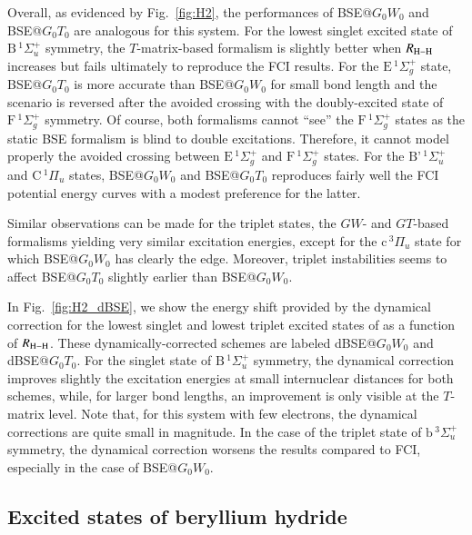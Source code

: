 \documentclass[aip,jcp,reprint,noshowkeys,superscriptaddress]{revtex4-1}
\begin{document}
Overall, as evidenced by Fig.~\ref{fig:H2}, the performances of BSE@$G_0W_0$ and BSE@$G_0T_0$ are analogous for this system.
For the lowest singlet excited state of $\text{B}\,{}^1\Sigma_u^+$ symmetry, the $T$-matrix-based formalism is slightly better when $R_{\ce{H-H}}$ increases but fails ultimately to reproduce the FCI results.
For the $\text{E}\,{}^1\Sigma_g^+$ state, BSE@$G_0T_0$ is more accurate than BSE@$G_0W_0$ for small bond length and the scenario is reversed after the avoided crossing with the doubly-excited state of $\text{F}\,{}^1\Sigma_g^+$ symmetry.
Of course, both formalisms cannot ``see'' the $\text{F}\,{}^1\Sigma_g^+$ states as the static BSE formalism is blind to double excitations.
Therefore, it cannot model properly the avoided crossing between $\text{E}\,{}^1\Sigma_g^+$ and $\text{F}\,{}^1\Sigma_g^+$ states.
For the $\text{B'}\,{}^1\Sigma_u^+$ and $\text{C}\,{}^1\Pi_u$ states, BSE@$G_0W_0$ and BSE@$G_0T_0$ reproduces fairly well the FCI potential energy curves with a modest preference for the latter.

Similar observations can be made for the triplet states, the $GW$- and $GT$-based formalisms yielding very similar excitation energies, except for the $\text{c}\,{}^3\Pi_u$ state for which BSE@$G_0W_0$ has clearly the edge.
Moreover, triplet instabilities seems to affect BSE@$G_0T_0$ slightly earlier than BSE@$G_0W_0$.

In Fig.~\ref{fig:H2_dBSE}, we show the energy shift provided by the dynamical correction for the lowest singlet and lowest triplet excited states of  as a function of $R_{\ce{H-H}}$. 
These dynamically-corrected schemes are labeled dBSE@$G_0W_0$ and dBSE@$G_0T_0$.
For the singlet state of $\text{B}\,{}^1\Sigma_u^+$ symmetry, the dynamical correction improves slightly the excitation energies at small internuclear distances for both schemes, while, for larger bond lengths, an improvement is only visible at the $T$-matrix level.
Note that, for this system with few electrons, the dynamical corrections are quite small in magnitude.
In the case of the triplet state of $\text{b}\,{}^3\Sigma_u^+$ symmetry, the dynamical correction worsens the results compared to FCI, especially in the case of BSE@$G_0W_0$.

\subsection{Excited states of beryllium hydride}
\label{sec:beh2}
\end{document}
